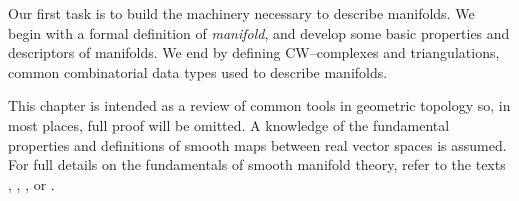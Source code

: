Our first task is to build the machinery necessary to describe manifolds.
We begin with a formal definition of \emph{manifold}, and develop some basic properties and descriptors of manifolds.
We end by defining CW--complexes and triangulations, common combinatorial data types used to describe manifolds.

This chapter is intended as a review of common tools in geometric topology so, in most places, full proof will be omitted.
A knowledge of the fundamental properties and definitions of smooth maps between real vector spaces is assumed.
For full details on the fundamentals of smooth manifold theory, refer to the texts \cite{GompStip}, \cite{Hirsch67}, \cite{Kosi93}, or \cite{Lee00}.
